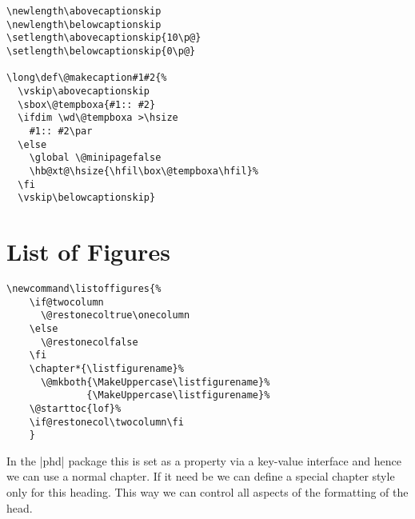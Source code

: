 
\def\figurename{\textbf{Figure}}

\setlength{}
\setlength{}

\long{}

\begin{tcolorbox}
\begin{lstlisting}
\newlength\abovecaptionskip
\newlength\belowcaptionskip
\setlength\abovecaptionskip{10\p@}
\setlength\belowcaptionskip{0\p@}

\long\def\@makecaption#1#2{%
  \vskip\abovecaptionskip
  \sbox\@tempboxa{#1:: #2}
  \ifdim \wd\@tempboxa >\hsize
    #1:: #2\par
  \else
    \global \@minipagefalse
    \hb@xt@\hsize{\hfil\box\@tempboxa\hfil}%
  \fi
  \vskip\belowcaptionskip}
\end{lstlisting}
\end{tcolorbox}

\section{List of Figures}
\begin{tcolorbox}
\begin{lstlisting}
\newcommand\listoffigures{%
    \if@twocolumn
      \@restonecoltrue\onecolumn
    \else
      \@restonecolfalse
    \fi
    \chapter*{\listfigurename}%
      \@mkboth{\MakeUppercase\listfigurename}%
              {\MakeUppercase\listfigurename}%
    \@starttoc{lof}%
    \if@restonecol\twocolumn\fi
    }
\end{lstlisting}
\end{tcolorbox}


In the |phd| package this is set as a property via a key-value interface and hence we can use a normal chapter. If it need be we can define a special chapter style only for this heading. This way we can control all aspects of the formatting of the head.

